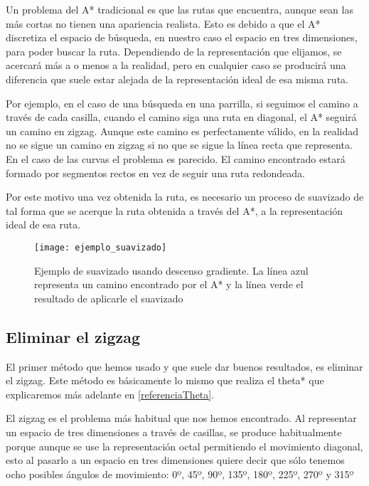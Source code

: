 Un problema del A* tradicional es que las rutas que encuentra, aunque sean las más cortas no tienen una apariencia realista. Esto es debido a que el A* discretiza el espacio de búsqueda, en nuestro caso el espacio en tres dimensiones, para poder buscar la ruta. Dependiendo de la representación que elijamos, se acercará más a o menos a la realidad, pero en cualquier caso se producirá una diferencia que suele estar alejada de la representación ideal de esa misma ruta.

Por ejemplo, en el caso de una búsqueda en una parrilla, si seguimos el camino a través de cada casilla, cuando el camino siga una ruta en diagonal, el A* seguirá un camino en zigzag. Aunque este camino es perfectamente válido, en la realidad no se sigue un camino en zigzag si no que se sigue la línea recta que representa. En el caso de las curvas el problema es parecido. El camino encontrado estará formado por segmentos rectos en vez de seguir una ruta redondeada.

Por este motivo una vez obtenida la ruta, es necesario un proceso de suavizado de tal forma que se acerque la ruta obtenida a través del A*, a la representación ideal de esa ruta.

\begin{figure}[htpb]
    \centering
    \texttt{[image: ejemplo\_suavizado]}
    \caption[Ejemplo de suavizado usando descenso gradiente]{Ejemplo de suavizado usando descenso gradiente. La línea azul representa un camino encontrado por el A* y la línea verde el resultado de aplicarle el suavizado}
    \label{fig:basics AFM sketch}
\end{figure}

\subsection{Eliminar el zigzag}

El primer método que hemos usado y que suele dar buenos resultados, es eliminar el zigzag. Este método es básicamente lo mismo que realiza el theta* que explicaremos más adelante en \ref{referenciaTheta}.

El zigzag es el problema más habitual que nos hemos encontrado. Al representar un espacio de tres dimensiones a través de casillas, se produce habitualmente porque aunque se use la representación octal permitiendo el movimiento diagonal, esto al pasarlo a un espacio en tres dimensiones quiere decir que sólo tenemos ocho posibles ángulos de movimiento: 0º, 45º, 90º, 135º, 180º, 225º, 270º y 315º

